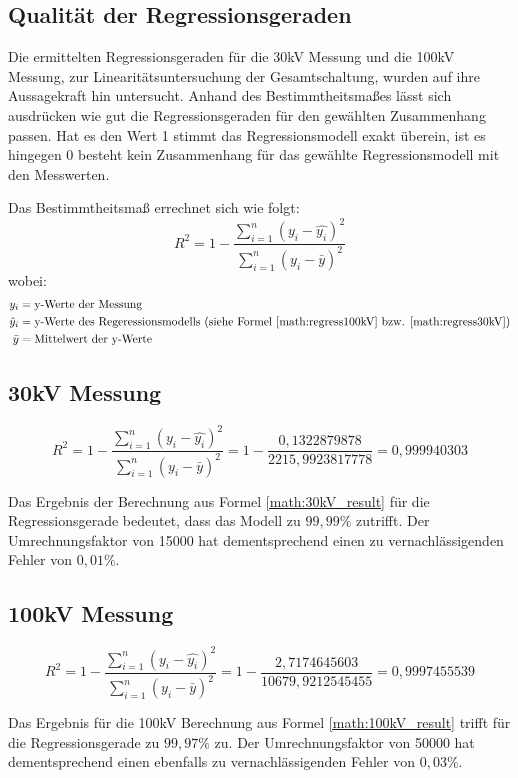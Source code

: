 \subsection{Qualität der Regressionsgeraden}
\begin{figure}[H]
\centering
\end{figure}
Die ermittelten Regressionsgeraden für die 30kV Messung und die 100kV Messung, zur Linearitätsuntersuchung der Gesamtschaltung, wurden auf ihre Aussagekraft hin untersucht. Anhand des Bestimmtheitsmaßes lässt sich ausdrücken wie gut die Regressionsgeraden für den gewählten Zusammenhang passen. Hat es den Wert 1 stimmt das Regressionsmodell exakt überein, ist es hingegen 0 besteht kein Zusammenhang für das gewählte Regressionsmodell mit den Messwerten.

Das Bestimmtheitsmaß errechnet sich wie folgt: 
\begin{equation}
R^{2} = 1 - \frac{\sum \limits_{i=1}^n (y_i - \hat{y_i})^{2}}{\sum \limits_{i=1}^n (y_i - \bar{y})^{2}}
\end{equation}
wobei:
\begin{align*}
y_i &= \text{y-Werte der Messung}\\
\hat{y}_i &= \text{y-Werte des Regeressionsmodells (siehe Formel \ref{math:regress100kV} bzw. \ref{math:regress30kV})}\\
\bar{y} &= \text{Mittelwert der y-Werte}
\end{align*}

\subsection{30kV Messung}

\begin{equation}
R^{2} = 1 - \frac{\sum \limits_{i=1}^n (y_i - \hat{y_i})^{2}}{\sum \limits_{i=1}^n (y_i - \bar{y})^{2}} = 1 - \frac{0,1322879878}{2215,9923817778} = 0,999940303
\label{math:30kV_result}
\end{equation}

Das Ergebnis der Berechnung aus Formel \ref{math:30kV_result} für die Regressionsgerade bedeutet, dass das Modell zu $99,99\%$ zutrifft. Der Umrechnungsfaktor von 15000 hat dementsprechend einen zu vernachlässigenden Fehler von $0,01\%$.

\subsection{100kV Messung}

\begin{equation}
R^{2} = 1 - \frac{\sum \limits_{i=1}^n (y_i - \hat{y_i})^{2}}{\sum \limits_{i=1}^n (y_i - \bar{y})^{2}} = 1 - \frac{2,7174645603}{10679,9212545455} = 0,9997455539
\label{math:100kV_result}
\end{equation}

Das Ergebnis für die 100kV Berechnung aus Formel \ref{math:100kV_result} trifft für die Regressionsgerade zu $99,97\%$ zu. Der Umrechnungsfaktor von 50000 hat dementsprechend einen ebenfalls zu vernachlässigenden Fehler von $0,03\%$.
